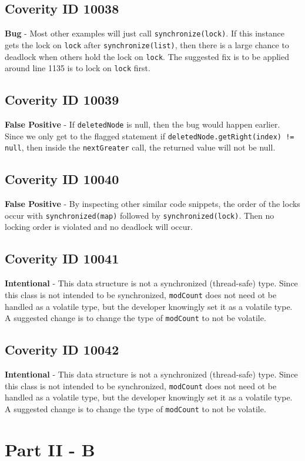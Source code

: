\documentclass[12pt]{article}
\begin{document}
\subsection{Coverity ID 10038}
\textbf{Bug} - Most other examples will just call \texttt{synchronize(lock)}. If this instance gets the lock on \texttt{lock} after \texttt{synchronize(list)}, then there is a large chance to deadlock when others hold the lock on \texttt{lock}. The suggested fix is to be applied around line 1135 is to lock on \texttt{lock} first.
\subsection{Coverity ID 10039}
\textbf{False Positive} - If \texttt{deletedNode} is null, then the bug would happen earlier. Since we only get to the flagged statement if \texttt{deletedNode.getRight(index) != null}, then inside the \texttt{nextGreater} call, the returned value will not be null.
\subsection{Coverity ID 10040}
\textbf{False Positive} - By inspecting other similar code snippets, the order of the locks occur with \texttt{synchronized(map)} followed by \texttt{synchronized(lock)}. Then no locking order is violated and no deadlock will occur.
\subsection{Coverity ID 10041}
\textbf{Intentional} - This data structure is not a synchronized (thread-safe) type. Since this class is not intended to be synchronized, \texttt{modCount} does not need ot be handled as a volatile type, but the developer knowingly set it as a volatile type. A suggested change is to change the type of \texttt{modCount} to not be volatile.
\subsection{Coverity ID 10042}
\textbf{Intentional} - This data structure is not a synchronized (thread-safe) type. Since this class is not intended to be synchronized, \texttt{modCount} does not need ot be handled as a volatile type, but the developer knowingly set it as a volatile type. A suggested change is to change the type of \texttt{modCount} to not be volatile.

\section{Part II - B}
\end{document}
